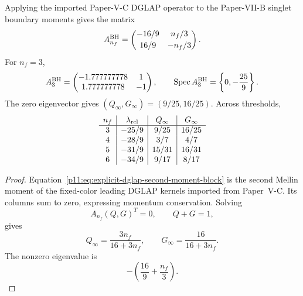 \documentclass[12pt,a4paper]{article}
\begin{document}
\begin{corollary}
\label{p11:cor:explicit-second-moment-dglap-blocks}
\leavevmode\par\noindent
Applying the imported Paper-V-C DGLAP operator to the Paper-VII-B singlet boundary moments gives the matrix
\begin{equation}
\label{p11:eq:explicit-dglap-second-moment-block}
A_{n_f}^{\rm BH}=\begin{pmatrix}
-16/9&n_f/3\\[0.2em]
16/9&-n_f/3
\end{pmatrix}.
\end{equation}
For \(n_f=3\),
\begin{equation}
A_3^{\rm BH}=\begin{pmatrix}
-1.777777778&1\\
1.777777778&-1
\end{pmatrix},
\qquad
\operatorname{Spec}A_3^{\rm BH}=\left\{0,-\frac{25}{9}\right\}.
\end{equation}
The zero eigenvector gives \((Q_\infty,G_\infty)=(9/25,16/25)\).  Across thresholds,
\begin{equation}
\label{p11:eq:dglap-threshold-fixed-points}
\begin{array}{c|c|c|c}
n_f&\lambda_{\rm rel}&Q_\infty&G_\infty\\ \hline
3&-25/9&9/25&16/25\\
4&-28/9&3/7&4/7\\
5&-31/9&15/31&16/31\\
6&-34/9&9/17&8/17
\end{array}
\end{equation}
\end{corollary}
\begin{proof}
Equation~\eqref{p11:eq:explicit-dglap-second-moment-block} is the second Mellin moment of the fixed-color leading DGLAP kernels imported from Paper~V-C.  Its columns sum to zero,
expressing momentum conservation.  Solving
\[
  A_{n_f}(Q,G)^T=0,
  \qquad
  Q+G=1,
\]
gives
\[
  Q_\infty=\frac{3n_f}{16+3n_f},
  \qquad
  G_\infty=\frac{16}{16+3n_f}.
\]
The nonzero eigenvalue is
\[
  -\left(\frac{16}{9}+\frac{n_f}{3}\right).
\]
\end{proof}
\end{document}
